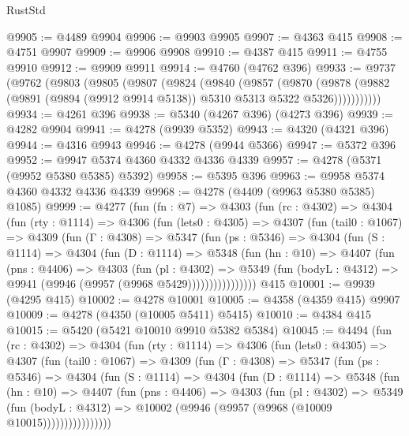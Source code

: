 \begin{lexlean}{RustStd}
\begin{coremodule}
{\begin{coremodule}
{{{{{{{{{{{{{{{{{{{{{{{{{{{{{{{{{{{@9905 := @4489 @9904
@9906 := @9903 @9905
@9907 := @4363 @415
@9908 := @4751 @9907
@9909 := @9906 @9908
@9910 := @4387 @415
@9911 := @4755 @9910
@9912 := @9909 @9911
@9914 := @4760 (@4762 @396)
@9933 := @9737
    (@9762
      (@9803
        (@9805
          (@9807
            (@9824
              (@9840
                (@9857
                  (@9870
                    (@9878
                      (@9882 (@9891 (@9894 (@9912 @9914 @5138)) @5310 @5313 @5322 @5326)))))))))))
@9934 := @4261 @396
@9938 := @5340 (@4267 @396) (@4273 @396)
@9939 := @4282 @9904
@9941 := @4278 (@9939 @5352)
@9943 := @4320 (@4321 @396)
@9944 := @4316 @9943
@9946 := @4278 (@9944 @5366)
@9947 := @5372 @396
@9952 := @9947 @5374 @4360 @4332 @4336 @4339
@9957 := @4278 (@5371 (@9952 @5380 @5385) @5392)
@9958 := @5395 @396
@9963 := @9958 @5374 @4360 @4332 @4336 @4339
@9968 := @4278 (@4409 (@9963 @5380 @5385) @1085)
@9999 := @4277
    (fun (fn : @7) =>
    @4303
      (fun (rc : @4302) =>
      @4304
        (fun (rty : @1114) =>
        @4306
          (fun (lets0 : @4305) =>
          @4307
            (fun (tail0 : @1067) =>
            @4309
              (fun (Γ : @4308) =>
              @5347
                (fun (ps : @5346) =>
                @4304
                  (fun (S : @1114) =>
                  @4304
                    (fun (D : @1114) =>
                    @5348
                      (fun (hn : @10) =>
                      @4407
                        (fun (pns : @4406) =>
                        @4303
                          (fun (pl : @4302) =>
                          @5349
                            (fun (bodyL : @4312) => @9941 (@9946 (@9957 (@9968 @5429))))))))))))))))
    @415
@10001 := @9939 (@4295 @415)
@10002 := @4278 @10001
@10005 := @4358 (@4359 @415) @9907
@10009 := @4278 (@4350 (@10005 @5411) @5415)
@10010 := @4384 @415
@10015 := @5420 (@5421 @10010 @9910 @5382 @5384)
@10045 := @4494
    (fun (rc : @4302) =>
    @4304
      (fun (rty : @1114) =>
      @4306
        (fun (lets0 : @4305) =>
        @4307
          (fun (tail0 : @1067) =>
          @4309
            (fun (Γ : @4308) =>
            @5347
              (fun (ps : @5346) =>
              @4304
                (fun (S : @1114) =>
                @4304
                  (fun (D : @1114) =>
                  @5348
                    (fun (hn : @10) =>
                    @4407
                      (fun (pns : @4406) =>
                      @4303
                        (fun (pl : @4302) =>
                        @5349
                          (fun (bodyL : @4312) =>
                          @10002 (@9946 (@9957 (@9968 (@10009 @10015))))))))))))))))
}}}}}}}}}}}}}}}}}}}}}}}}}}}}}}}}}}}
\end{coremodule}}
\end{coremodule}
\end{lexlean}

